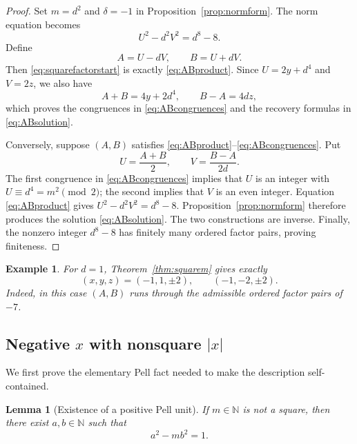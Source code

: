 \documentclass[11pt,a4paper]{amsart}
\numberwithin{equation}{section}
\newtheorem{lemma}[theorem]{Lemma}
\newtheorem{example}[theorem]{Example}
\theoremstyle{definition}
\newcommand{\N}{\mathbb N}
\begin{document}
\begin{proof}
Set \(m=d^2\) and \(\delta=-1\) in
Proposition~\ref{prop:normform}.  The norm equation becomes
\begin{equation}
 U^2-d^2V^2=d^8-8.
 \label{eq:squarefactorstart}
\end{equation}
Define
\begin{equation}
 A=U-dV,
 \qquad B=U+dV.
 \label{eq:ABdef}
\end{equation}
Then \eqref{eq:squarefactorstart} is exactly
\eqref{eq:ABproduct}.  Since \(U=2y+d^4\) and \(V=2z\), we also have
\begin{equation*}
 A+B=4y+2d^4,
 \qquad B-A=4dz,
\end{equation*}
which proves the congruences in \eqref{eq:ABcongruences} and the
recovery formulas in \eqref{eq:ABsolution}.

Conversely, suppose \((A,B)\) satisfies
\eqref{eq:ABproduct}--\eqref{eq:ABcongruences}.  Put
\begin{equation*}
 U=\frac{A+B}{2},
 \qquad V=\frac{B-A}{2d}.
\end{equation*}
The first congruence in \eqref{eq:ABcongruences} implies that \(U\) is
an integer with \(U\equiv d^4=m^2\pmod2\); the second implies that
\(V\) is an even integer.  Equation \eqref{eq:ABproduct} gives
\(U^2-d^2V^2=d^8-8\).  Proposition~\ref{prop:normform} therefore
produces the solution \eqref{eq:ABsolution}.  The two constructions are
inverse.  Finally, the nonzero integer \(d^8-8\) has finitely many
ordered factor pairs, proving finiteness.
\end{proof}

\begin{example}
For \(d=1\), Theorem~\ref{thm:squarem} gives exactly
\begin{equation}
 (x,y,z)=(-1,1,\pm2),
 \qquad
 (-1,-2,\pm2).
 \label{eq:xminusone}
\end{equation}
Indeed, in this case \((A,B)\) runs through the admissible ordered
factor pairs of \(-7\).
\end{example}

\subsection{Negative \texorpdfstring{\(x\)}{x} with nonsquare \texorpdfstring{\(|x|\)}{|x|}}

We first prove the elementary Pell fact needed to make the description
self-contained.

\begin{lemma}[Existence of a positive Pell unit]\label{lem:pell}
If \(m\in\N\) is not a square, then there exist \(a,b\in\N\) such that
\begin{equation}
 a^2-mb^2=1.
 \label{eq:pellunit}
\end{equation}
\end{lemma}
\end{document}
